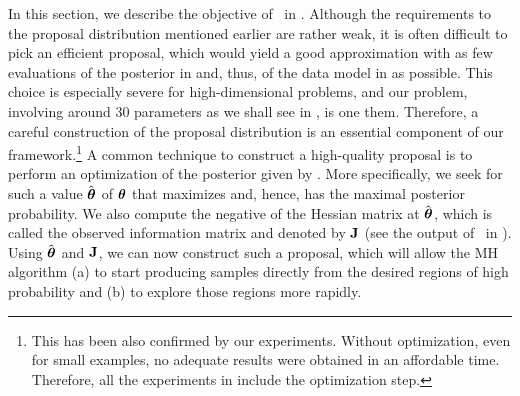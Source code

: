 In this section, we describe the objective of \ in .
Although the requirements to the proposal distribution mentioned earlier are rather weak, it is often difficult to pick an efficient proposal, which would yield a good approximation with as few evaluations of the posterior in  and, thus, of the data model in  as possible.
This choice is especially severe for high-dimensional problems, and our problem, involving around 30 parameters as we shall see in , is one them.
Therefore, a careful construction of the proposal distribution is an essential component of our framework.\footnote{This has been also confirmed by our experiments. Without optimization, even for small examples, no adequate results were obtained in an affordable time. Therefore, all the experiments in  include the optimization step.}
A common technique to construct a high-quality proposal is to perform an optimization of the posterior given by .
More specifically, we seek for such a value $\hat{{\boldsymbol\theta}}$ of ${\boldsymbol\theta}$ that maximizes  and, hence, has the maximal posterior probability.
We also compute the negative of the Hessian matrix at $\hat{{\boldsymbol\theta}}$, which is called the observed information matrix and denoted by $\mathbf{J}$ (see the output of \ in ).
Using $\hat{{\boldsymbol\theta}}$ and $\mathbf{J}$, we can now construct such a proposal, which will allow the MH algorithm (a) to start producing samples directly from the desired regions of high probability and (b) to explore those regions more rapidly.
